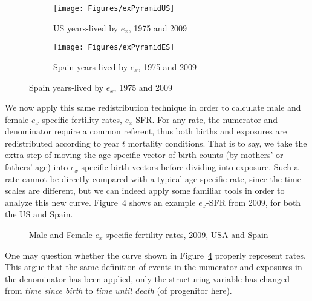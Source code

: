 \begin{figure}
        \centering
        \begin{subfigure}
                \centering
                \caption{US years-lived by $e_x$, 1975 and 2009}
                \texttt{[image: Figures/exPyramidUS]}
                \label{fig:exPyrUS}
        \end{subfigure}
        \begin{subfigure}
                \centering
                \caption{Spain years-lived by $e_x$, 1975 and 2009}
                \texttt{[image: Figures/exPyramidES]}
               
                \label{fig:exPyrES}
        \end{subfigure}
\end{figure}

We now apply this same redistribution technique in order to
calculate male and female $e_x$-specific fertility rates, $e_x$-SFR. For any
rate, the numerator and denominator require a common referent, thus both births and
exposures are redistributed according to year $t$ mortality conditions. That
is to say, we take the extra step of moving the age-specific vector
of birth counts (by mothers' or fathers' age) into $e_x$-specific birth
vectors before dividing into exposure. Such a rate cannot be directly compared
with a typical age-specific rate, since the time scales are different, but we 
can indeed apply some familiar tools in order to analyze this new curve. 
Figure~\ref{fig:eSFR2009} shows an example $e_x$-SFR from 2009, for both the US and Spain.

\begin{figure}[ht!]
        \centering  
          \caption{Male and Female $e_x$-specific fertility rates, 2009, USA and
          Spain}
          \label{fig:eSFR2009}
\end{figure}

One may question whether the curve shown in Figure~\ref{fig:eSFR2009} properly
represent rates. This argue that the same definition of events in the
numerator and exposures in the denominator has been applied, only the
structuring variable has changed from \textit{time since birth} to \textit{time
until death} (of progenitor here).

